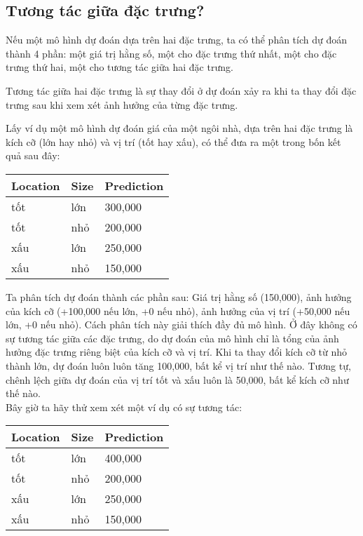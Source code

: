 \subsection{Tương tác giữa đặc trưng?}
Nếu một mô hình dự đoán dựa trên hai đặc trưng, ta có thể phân tích dự đoán thành 4 phần: một giá trị hằng số, một cho đặc trưng thứ nhất, một cho đặc trưng thứ hai, một cho tương tác giữa hai đặc trưng.

Tương tác giữa hai đặc trưng là sự thay đổi ở dự đoán xảy ra khi ta thay đổi đặc trưng sau khi xem xét ảnh hưởng của từng đặc trưng.

Lấy ví dụ một mô hình dự đoán giá của một ngôi nhà, dựa trên hai đặc trưng là kích cỡ (lớn hay nhỏ) và vị trí (tốt hay xấu), có thể đưa ra một trong bốn kết quả sau đây:

\begin{table}[hbt!]
\centering
\begin{tabular}{|l|l|l|}
\hline
   \textbf{Location} & \textbf{Size} & \textbf{Prediction} \\ 
\hline
tốt & lớn & 300,000 \\ 
\hline
tốt & nhỏ & 200,000 \\ 
\hline
xấu & lớn & 250,000 \\
\hline
xấu & nhỏ & 150,000 \\
\hline
\end{tabular}
\end{table}

Ta phân tích dự đoán thành các phần sau: Giá trị hằng số (150,000), ảnh hưởng của kích cỡ (+100,000 nếu lớn, +0 nếu nhỏ), ảnh hưởng của vị trí (+50,000 nếu lớn, +0 nếu nhỏ). Cách phân tích này giải thích đầy đủ mô hình. Ở đây không có sự tương tác giữa các đặc trưng, do dự đoán của mô hình chỉ là tổng của ảnh hưởng đặc trưng riêng biệt của kích cỡ và vị trí. Khi ta thay đổi kích cỡ từ nhỏ thành lớn, dự đoán luôn luôn tăng 100,000, bất kể vị trí như thế nào. Tương tự, chênh lệch giữa dự đoán của vị trí tốt và xấu luôn là 50,000, bất kể kích cỡ như thế nào.\\
Bây giờ ta hãy thử xem xét một ví dụ có sự tương tác:

\begin{table}[hbt!]
\centering
\begin{tabular}{|l|l|l|}
\hline
   \textbf{Location} & \textbf{Size} & \textbf{Prediction} \\ 
\hline
tốt & lớn & 400,000 \\ 
\hline
tốt & nhỏ & 200,000 \\ 
\hline
xấu & lớn & 250,000 \\
\hline
xấu & nhỏ & 150,000 \\
\hline
\end{tabular}
\end{table}

